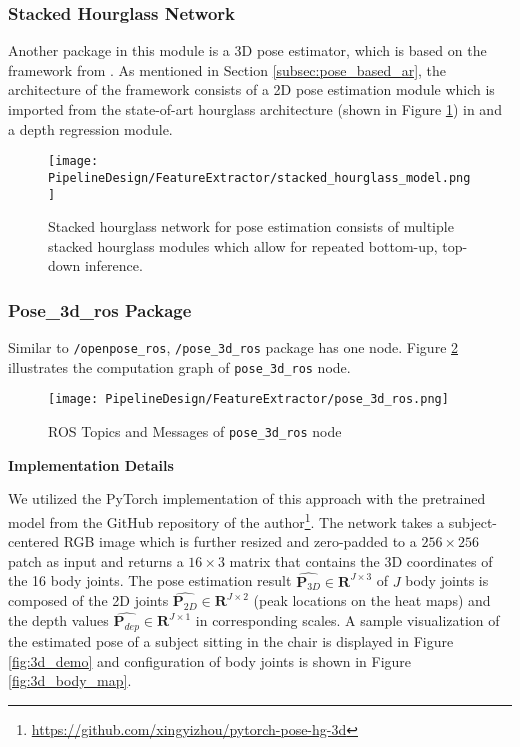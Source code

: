 \subsubsection{Stacked Hourglass Network}

Another package in this module is a 3D pose estimator, which is based on the framework from \cite{DBLP:journals/corr/ZhouH0XW17}. As mentioned in Section \ref{subsec:pose_based_ar}, the architecture of the framework consists of a 2D pose estimation module which is imported from
the state-of-art hourglass architecture (shown in Figure \ref{fig:stacked_hourglass_model}) in \cite{DBLP:conf/eccv/NewellYD16} and a depth regression module. 

\begin{figure}[h!]
  \centering
  \texttt{[image: PipelineDesign/FeatureExtractor/stacked\_hourglass\_model.png]}
  \caption{Stacked hourglass network for pose estimation consists of multiple stacked hourglass modules
           which allow for repeated bottom-up, top-down inference. \cite{DBLP:conf/eccv/NewellYD16}}
  \label{fig:stacked_hourglass_model}
\end{figure}  

\subsubsection{Pose\_3d\_ros Package}

Similar to \texttt{/openpose\_ros}, \texttt{/pose\_3d\_ros} package has one node. Figure \ref{fig:pose_3d_ros} illustrates the computation graph of \texttt{pose\_3d\_ros} node.

\begin{figure}[h!]
  \centering
  \texttt{[image: PipelineDesign/FeatureExtractor/pose\_3d\_ros.png]}
  \caption{ROS Topics and Messages of \texttt{pose\_3d\_ros} node}
  \label{fig:pose_3d_ros}
\end{figure} 

\textbf{Implementation Details}

We utilized the PyTorch implementation of this approach with the pretrained model from the GitHub repository of the author\footnote{\url{https://github.com/xingyizhou/pytorch-pose-hg-3d}}. The network takes a subject-centered RGB image which is further resized and zero-padded to a $256 \times 256$ patch as input and returns a $16 \times 3$ matrix that contains the 3D coordinates of the 16 body joints. The pose estimation result $\hat{\mathbf{P}_{3D}} \in \mathbf{R}^{J\times 3}$ of $J$ body joints is composed of the 2D joints $\hat{\mathbf{P}_{2D}} \in \mathbf{R}^{J\times 2}$ (peak locations on the heat maps) and the depth values $\hat{\mathbf{P}_{dep}} \in \mathbf{R}^{J\times 1}$ in corresponding scales. A sample visualization of the estimated pose of a subject sitting in the chair is displayed in Figure \ref{fig:3d_demo} and configuration of body joints is shown in Figure \ref{fig:3d_body_map}.

